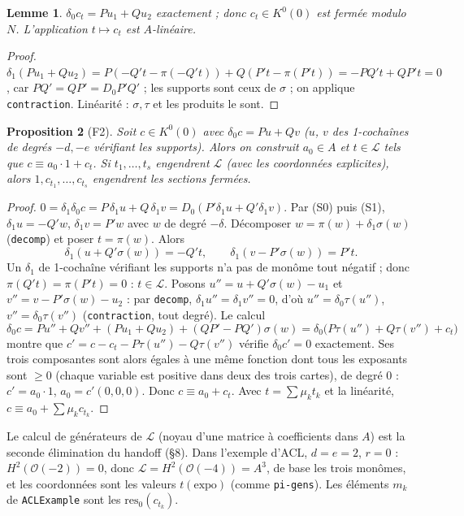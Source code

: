 \documentclass[11pt]{amsart}
\newtheorem{proposition}{Proposition}
\newtheorem{lemma}[proposition]{Lemme}
\theoremstyle{remark}
\begin{document}
\begin{lemma}\label{lem:ct}
$\delta_0c_t=Pu_1+Qu_2$ exactement ; donc $c_t\in K^0(0)$ est fermée
modulo $N$. L'application $t\mapsto c_t$ est $A$-linéaire.
\end{lemma}
\begin{proof}
$\delta_1(Pu_1+Qu_2)=P(-Q't-\pi(-Q't))+Q(P't-\pi(P't))=-PQ't+QP't=0$,
car $PQ'=QP'=D_0P'Q'$ ; les supports sont ceux de $\sigma$ ; on applique
\texttt{contraction}. Linéarité : $\sigma,\tau$ et les produits le sont.
\end{proof}

\begin{proposition}[F2]\label{prop:F2}
Soit $c\in K^0(0)$ avec $\delta_0c=Pu+Qv$ ($u$, $v$ des 1-cochaînes de
degrés $-d,-e$ vérifiant les supports). Alors on construit $a_0\in A$ et
$t\in\mathcal L$ tels que $c\equiv a_0\cdot1+c_t$. Si $t_1,\dots,t_s$
engendrent $\mathcal L$ (avec les coordonnées explicites), alors
$1,c_{t_1},\dots,c_{t_s}$ engendrent les sections fermées.
\end{proposition}
\begin{proof}
$0=\delta_1\delta_0c=P\,\delta_1u+Q\,\delta_1v=D_0(P'\delta_1u+Q'\delta_1v)$.
Par (S0) puis (S1), $\delta_1u=-Q'w$, $\delta_1v=P'w$ avec $w$ de degré
$-\delta$. Décomposer $w=\pi(w)+\delta_1\sigma(w)$ (\texttt{decomp}) et
poser $t=\pi(w)$. Alors
\[
 \delta_1(u+Q'\sigma(w))=-Q't,\qquad \delta_1(v-P'\sigma(w))=P't .
\]
Un $\delta_1$ de 1-cochaîne vérifiant les supports n'a pas de monôme tout
négatif ; donc $\pi(Q't)=\pi(P't)=0$ : $t\in\mathcal L$. Posons
$u''=u+Q'\sigma(w)-u_1$ et $v''=v-P'\sigma(w)-u_2$ : par
\texttt{decomp}, $\delta_1u''=\delta_1v''=0$, d'où
$u''=\delta_0\tau(u'')$, $v''=\delta_0\tau(v'')$
(\texttt{contraction}, tout degré). Le calcul
\[
 \delta_0c=Pu''+Qv''+(Pu_1+Qu_2)+(QP'-PQ')\sigma(w)
          =\delta_0\big(P\tau(u'')+Q\tau(v'')+c_t\big)
\]
montre que $c'=c-c_t-P\tau(u'')-Q\tau(v'')$ vérifie $\delta_0c'=0$
exactement. Ses trois composantes sont alors égales à une même fonction
dont tous les exposants sont $\ge0$ (chaque variable est positive dans
deux des trois cartes), de degré $0$ : $c'=a_0\cdot1$, $a_0=c'(0,0,0)$.
Donc $c\equiv a_0+c_t$. Avec $t=\sum\mu_kt_k$ et la linéarité,
$c\equiv a_0+\sum\mu_kc_{t_k}$.
\end{proof}

Le calcul de générateurs de $\mathcal L$ (noyau d'une matrice à
coefficients dans $A$) est la seconde élimination du handoff (\S8). Dans
l'exemple d'ACL, $d=e=2$, $r=0$ : $H^2(\mathcal O(-2))=0$, donc
$\mathcal L=H^2(\mathcal O(-4))=A^3$, de base les trois monômes, et les
coordonnées sont les valeurs $t(\mathrm{expo})$ (comme
\texttt{pi-gens}). Les éléments $m_k$ de \texttt{ACLExample} sont les
$\mathrm{res}_0(c_{t_k})$.
\end{document}
